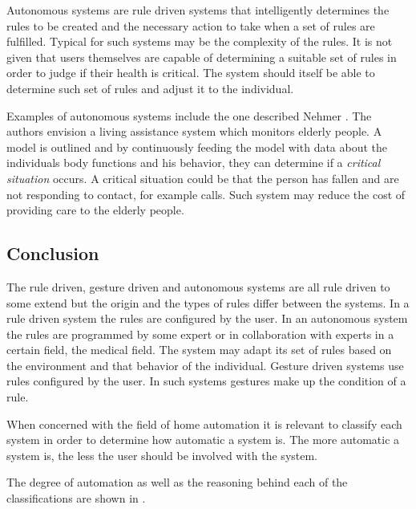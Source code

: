 Autonomous systems are rule driven systems that intelligently determines the rules to be created and the necessary action to take when a set of rules are fulfilled. 
Typical for such systems may be the complexity of the rules. 
It is not given that users themselves are capable of determining a suitable set of rules in order to judge if their health is critical. 
The system should itself be able to determine such set of rules and adjust it to the individual.

Examples of autonomous systems include the one described Nehmer \etal \cite{nehmer2006living}. 
The authors envision a living assistance system which monitors elderly people. 
A model is outlined and by continuously feeding the model with data about the individuals body functions and his behavior, 
they can determine if a \emph{critical situation} occurs. 
A critical situation could be that the person has fallen and are not responding to contact, for example calls.
Such system may reduce the cost of providing care to the elderly people.

\subsection{Conclusion}

The rule driven, gesture driven and autonomous systems are all rule driven to some extend but the origin and the types of rules differ between the systems. 
In a rule driven system the rules are configured by the user.
In an autonomous system the rules are programmed by some expert or in collaboration with experts in a certain field, \eg the medical field. 
The system may adapt its set of rules based on the environment and that behavior of the individual.
Gesture driven systems use rules configured by the user. 
In such systems gestures make up the condition of a rule.

When concerned with the field of home automation it is relevant to classify each system in order to determine how automatic a system is. 
The more automatic a system is, the less the user should be involved with the system.

The degree of automation as well as the reasoning behind each of the classifications are shown in .

